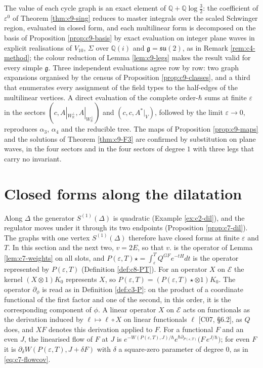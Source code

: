 \begin{remark}
\label{rem:c9-method3}
The value of each cycle graph is an exact element of $\mathbb Q+\mathbb Q\log\tfrac32$: the coefficient of $\varepsilon^0$ of Theorem \ref{thm:c9-sing} reduces to master integrals over the scaled Schwinger region, evaluated in closed form, and each multilinear form is decomposed on the basis of Proposition \ref{prop:c9-basis} by exact evaluation on integer plane waves in explicit realisations of $V_{10}$, $\Sigma$ over $\mathbb Q(i)$ and $\mathfrak g=\mathfrak{su}(2)$, as in Remark \ref{rem:c4-method}; the colour reduction of Lemma \ref{lem:c9-legs} makes the result valid for every simple $\mathfrak g$. Three independent evaluations agree row by row: two graph expansions organised by the census of Proposition \ref{prop:c9-classes}, and a third that enumerates every assignment of the field types to the half-edges of the multilinear vertices. A direct evaluation of the complete order-$\hbar$ sums at finite $\varepsilon$ in the sectors $(c,A|_{W_{\mathbb R}^\perp},A|_{W_{\mathbb R}^\perp})$ and $(c,c,A^*|_V)$, followed by the limit $\varepsilon\to0$, reproduces $\alpha_3$, $\alpha_4$ and the reducible tree. The maps of Proposition \ref{prop:c9-maps} and the solutions of Theorem \ref{thm:c9-F3} are confirmed by substitution on plane waves, in the four sectors and in the four sectors of degree $1$ with three legs that carry no invariant.
\end{remark}

\section{Closed forms along the dilatation}

Along $\Delta$ the generator $S^{(1)}(\Delta)$ is quadratic (Example \ref{ex:c2-dil}), and the regulator moves under it through its two endpoints (Proposition \ref{prop:c7-dil}). The graphs with one vertex $S^{(1)}(\Delta)$ therefore have closed forms at finite $\varepsilon$ and $T$. In this section and the next two, $v=2E$, so that $v.$ is the operator of Lemma \ref{lem:c7-weights} on all slots, and $P(\varepsilon,T)\star=\int_\varepsilon^TQ^{GF}e^{-tH}dt$ is the operator represented by $P(\varepsilon,T)$ (Definition \ref{def:c8-PT}). For an operator $X$ on $\mathscr E$ the kernel $(X\otimes1)K_0$ represents $X$, so $P(\varepsilon,T)=(P(\varepsilon,T)\star\otimes1)K_0$. The operator $\partial_\phi$ is read as in Definition \ref{def:c3-P}: on the product of a coordinate functional of the first factor and one of the second, in this order, it is the corresponding component of $\phi$. A linear operator $X$ on $\mathscr E$ acts on functionals as the derivation induced by $\ell\mapsto\ell\circ X$ on linear functionals $\ell$ [C07, §6.2], as $Q$ does, and $XF$ denotes this derivation applied to $F$. For a functional $F$ and an even $J$, the linearised flow of $F$ at $J$ is $e^{-W(P(\varepsilon,T),J)/\hbar}e^{\hbar\partial_{P(\varepsilon,T)}}\big(F\,e^{J/\hbar}\big)$; for even $F$ it is $\partial_\delta W(P(\varepsilon,T),J+\delta F)$ with $\delta$ a square-zero parameter of degree $0$, as in \eqref{eq:c7-flowcov}.

